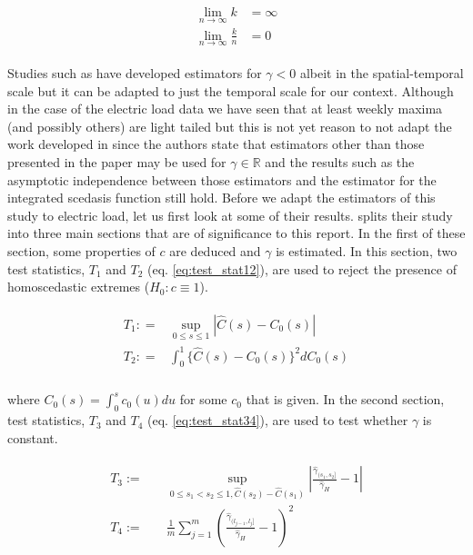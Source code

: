 \begin{align} \label{eq:k_cond}
\begin{split}
\lim_{n \rightarrow \infty} k &= \infty \\
\lim_{n \rightarrow \infty} \frac{k}{n} &= 0
\end{split}
\end{align}

\noindent Studies such as \citet{Ferreira17} have developed estimators for $\gamma < 0$ albeit in the spatial-temporal scale but it can be adapted to just the temporal scale for our context. Although in the case of the electric load data we have seen that at least weekly maxima (and possibly others) are light tailed but this is not yet reason to not adapt the work developed in \cite{einmahl16}  since the authors state that estimators other than those presented in the paper may be used for $\gamma \in \mathbb{R}$ and the results such as the asymptotic independence between those estimators and the estimator for the integrated scedasis function still hold. Before we adapt the estimators of this study to electric load, let us first look at some of their results. \cite{einmahl16} splits their study into three main sections that are of significance to this report. In the first of these section, some properties of $c$ are deduced and $\gamma$ is estimated. In this section, two test statistics, $T_1$ and $T_2$ (eq. \ref{eq:test_stat12}), are used to reject the presence of homoscedastic extremes ($H_0: c \equiv 1$). 

\begin{align} \label{eq:test_stat12}
\begin{split}
T_1 : =& \sup_{0 \le s \le 1} |\hat{C}(s) - C_0(s)|\\
T_2 : =& \int_0^1 \{\hat{C}(s) - C_0(s)\}^2 dC_0(s)\\
\end{split}
\end{align}

\noindent where $C_0(s) = \int_0^s c_0(u)du$ for some $c_0$ that is given. In the second section, test statistics, $T_3$ and $T_4$ (eq. \ref{eq:test_stat34}), are used to test whether $\gamma$ is constant.

\begin{align}  \label{eq:test_stat34}
\begin{split}
T_3 := & \quad \sup_{0 \le s_1 < s_2 \le 1, \hat{C}(s_2) - \hat{C}(s_1)}|\frac{\hat{\gamma}_{(s_1,s_2]}}{\hat{\gamma}_H} -1| \\
T_4 := & \quad \frac{1}{m} \sum_{j=1}^m (\frac{\hat{\gamma}_{(l_{j-1},l_j]}}{\hat{\gamma}_H}-1)^2
\end{split}
\end{align}

